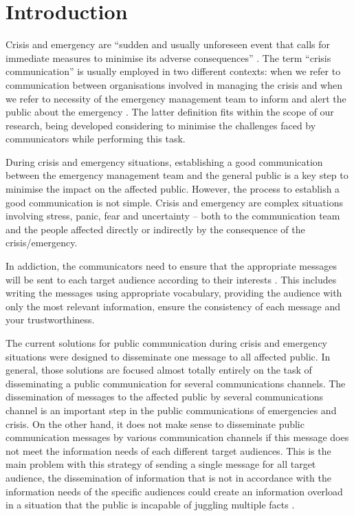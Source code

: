 \section{Introduction}

Crisis and emergency are ``sudden and usually unforeseen event that calls for immediate measures to minimise its adverse consequences'' \citep{dha1992internationally}. The term ``crisis communication'' is usually employed in two different contexts: when we refer to communication between organisations involved in managing the crisis and when we refer to necessity of the emergency management team to inform and alert the public about the emergency \citep{cdc2014}. The latter definition fits within the scope of our research, being developed considering to minimise the challenges faced by communicators while performing this task. 

During crisis and emergency situations, establishing a good communication between the emergency management team and the general public is a key step to minimise the impact on the affected public. However, the process to establish a good communication is not simple. Crisis and emergency are complex situations involving stress, panic, fear and uncertainty \citep{reynolds2007crisis} -- both to the communication team and the people affected directly or indirectly by the consequence of the crisis/emergency.

In addiction, the communicators need to ensure that the appropriate messages will be sent to each target audience according to their interests \citep{panamericanhealthorganization2009}. This includes writing the messages using appropriate vocabulary, providing the audience with only the most relevant information, ensure the consistency of each message and your trustworthiness. 

The current solutions for public communication during crisis and emergency situations were designed to disseminate one message to all affected public\citep{malizia2010sema4a}\citep{pereirachallenges}. In general, those solutions are focused almost totally entirely on the task of disseminating a public communication for several communications channels. The dissemination of messages to the affected public by several communications channel is an important step in the public communications of emergencies and crisis. On the other hand, it does not make sense to disseminate public communication messages by various communication channels if this message does not meet the information needs of each different target audiences. This is the main problem with this strategy of sending a single message for all target audience, the dissemination of information that is not in accordance with the information needs of the specific audiences could create an information overload in a situation that the public is incapable of juggling multiple facts \citep{cdc2014}. 


